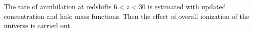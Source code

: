 The rate of annihilation at redshifts $6<z<30$ is estimated with updated concentration and halo mass functions. Then the effect of overall ionization of the universe is carried out.